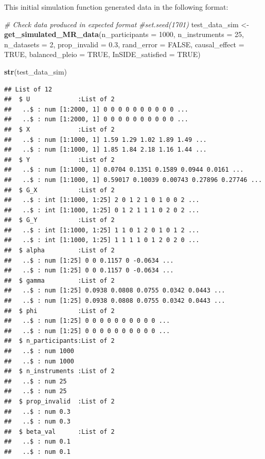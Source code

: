 \documentclass[
]{article}
\newenvironment{Shaded}{\begin{snugshade}}{\end{snugshade}}
\newcommand{\AttributeTok}[1]{\textcolor[rgb]{0.13,0.29,0.53}{#1}}
\newcommand{\CommentTok}[1]{\textcolor[rgb]{0.56,0.35,0.01}{\textit{#1}}}
\newcommand{\ConstantTok}[1]{\textcolor[rgb]{0.56,0.35,0.01}{#1}}
\newcommand{\DecValTok}[1]{\textcolor[rgb]{0.00,0.00,0.81}{#1}}
\newcommand{\FloatTok}[1]{\textcolor[rgb]{0.00,0.00,0.81}{#1}}
\newcommand{\FunctionTok}[1]{\textcolor[rgb]{0.13,0.29,0.53}{\textbf{#1}}}
\newcommand{\NormalTok}[1]{#1}
\newcommand{\OtherTok}[1]{\textcolor[rgb]{0.56,0.35,0.01}{#1}}
\begin{document}
This initial simulation function generated data in the following format:

\begin{Shaded}
\begin{Highlighting}[]
\CommentTok{\# Check data produced in expected format}
\CommentTok{\#set.seed(1701)}
\NormalTok{test\_data\_sim }\OtherTok{\textless{}{-}} \FunctionTok{get\_simulated\_MR\_data}\NormalTok{(}\AttributeTok{n\_participants =} \DecValTok{1000}\NormalTok{,}
                                       \AttributeTok{n\_instruments =} \DecValTok{25}\NormalTok{,}
                                       \AttributeTok{n\_datasets =} \DecValTok{2}\NormalTok{,}
                                       \AttributeTok{prop\_invalid =} \FloatTok{0.3}\NormalTok{,}
                                       \AttributeTok{rand\_error =} \ConstantTok{FALSE}\NormalTok{,}
                                       \AttributeTok{causal\_effect =} \ConstantTok{TRUE}\NormalTok{,}
                                       \AttributeTok{balanced\_pleio =} \ConstantTok{TRUE}\NormalTok{,}
                                       \AttributeTok{InSIDE\_satisfied =} \ConstantTok{TRUE}\NormalTok{)}

\FunctionTok{str}\NormalTok{(test\_data\_sim)}
\end{Highlighting}
\end{Shaded}

\begin{verbatim}
## List of 12
##  $ U             :List of 2
##   ..$ : num [1:2000, 1] 0 0 0 0 0 0 0 0 0 0 ...
##   ..$ : num [1:2000, 1] 0 0 0 0 0 0 0 0 0 0 ...
##  $ X             :List of 2
##   ..$ : num [1:1000, 1] 1.59 1.29 1.02 1.89 1.49 ...
##   ..$ : num [1:1000, 1] 1.85 1.84 2.18 1.16 1.44 ...
##  $ Y             :List of 2
##   ..$ : num [1:1000, 1] 0.0704 0.1351 0.1589 0.0944 0.0161 ...
##   ..$ : num [1:1000, 1] 0.59017 0.10039 0.00743 0.27896 0.27746 ...
##  $ G_X           :List of 2
##   ..$ : int [1:1000, 1:25] 2 0 1 2 1 0 1 0 0 2 ...
##   ..$ : int [1:1000, 1:25] 0 1 2 1 1 1 0 2 0 2 ...
##  $ G_Y           :List of 2
##   ..$ : int [1:1000, 1:25] 1 1 0 1 2 0 1 0 1 2 ...
##   ..$ : int [1:1000, 1:25] 1 1 1 1 0 1 2 0 2 0 ...
##  $ alpha         :List of 2
##   ..$ : num [1:25] 0 0 0.1157 0 -0.0634 ...
##   ..$ : num [1:25] 0 0 0.1157 0 -0.0634 ...
##  $ gamma         :List of 2
##   ..$ : num [1:25] 0.0938 0.0808 0.0755 0.0342 0.0443 ...
##   ..$ : num [1:25] 0.0938 0.0808 0.0755 0.0342 0.0443 ...
##  $ phi           :List of 2
##   ..$ : num [1:25] 0 0 0 0 0 0 0 0 0 0 ...
##   ..$ : num [1:25] 0 0 0 0 0 0 0 0 0 0 ...
##  $ n_participants:List of 2
##   ..$ : num 1000
##   ..$ : num 1000
##  $ n_instruments :List of 2
##   ..$ : num 25
##   ..$ : num 25
##  $ prop_invalid  :List of 2
##   ..$ : num 0.3
##   ..$ : num 0.3
##  $ beta_val      :List of 2
##   ..$ : num 0.1
##   ..$ : num 0.1
\end{verbatim}
\end{document}
